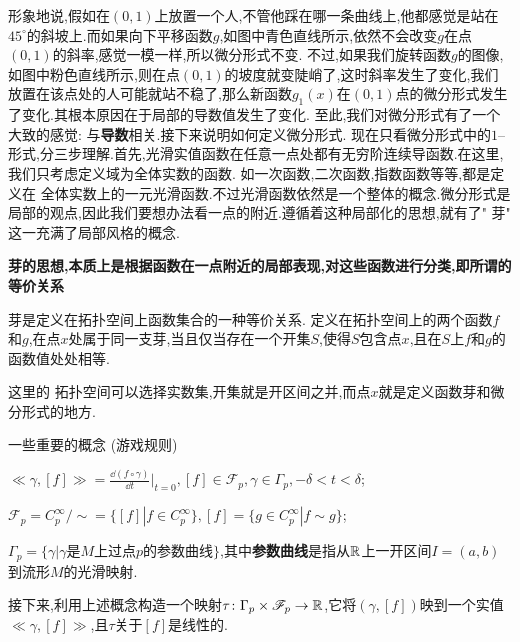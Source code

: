 形象地说,假如在$(0,1)$上放置一个人,不管他踩在哪一条曲线上,他都感觉是站在$45^\circ$的斜坡上.而如果向下平移函数$g$,如图中青色直线所示,依然不会改变$g$在点$(0,1)$的斜率,感觉一模一样,所以微分形式不变.
不过,如果我们旋转函数$g$的图像,如图中粉色直线所示,则在点$(0,1)$的坡度就变陡峭了,这时斜率发生了变化,我们放置在该点处的人可能就站不稳了,那么新函数$g_1(x)$在$(0,1)$点的微分形式发生了变化.其根本原因在于局部的导数值发生了变化.
至此,我们对微分形式有了一个大致的感觉: 与\textbf{导数}相关.接下来说明如何定义微分形式.
现在只看微分形式中的$1$--形式,分三步理解.首先,光滑实值函数在任意一点处都有无穷阶连续导函数.在这里,我们只考虑定义域为全体实数的函数. 如一次函数,二次函数,指数函数等等,都是定义在
全体实数上的一元光滑函数.不过光滑函数依然是一个整体的概念.微分形式是局部的观点,因此我们要想办法看一点的附近.遵循着这种局部化的思想,就有了" 芽"
这一充满了局部风格的概念.

\textbf{芽的思想,本质上是根据函数在一点附近的局部表现,对这些函数进行分类,即所谓的等价关系}
\begin{definition}[芽][def:芽]
    芽是定义在拓扑空间上函数集合的一种等价关系.
    定义在拓扑空间上的两个函数$f$和$g$,在点$x$处属于同一支芽,当且仅当存在一个开集$S$,使得$S$包含点$x$,且在$S$上$f$和$g$的函数值处处相等.
\end{definition}
这里的 拓扑空间可以选择实数集,开集就是开区间之并,而点$x$就是定义函数芽和微分形式的地方.

一些重要的概念 (游戏规则)

$\ll \gamma,[f]\gg =\frac{\dd (f\circ \gamma)}{\dd t}\Bigg|_{t=0},[f]\in \mathscr{F}_p,\gamma\in \Gamma_p,-\delta< t< \delta$;

$\mathscr{F}_p=C_p^\infty/\sim=\{[f]|f\in C_p^\infty\},[f]=\{g\in C_p^\infty|f\sim g\}$;

$\Gamma_p=\{\gamma |\gamma\text{是$M$上过点$p$的参数曲线}\}$,其中\textbf{参数曲线}是指从$\mathbb{R}$上一开区间$I=(a,b)$到流形$M$的光滑映射.

接下来,利用上述概念构造一个映射$\tau\colon \Gamma_p \times \mathscr{F}_p\to \mathbb{R}$,它将$(\gamma,[f])$映到一个实值$\ll \gamma,[f]\gg$,且$\tau$关于$[f]$是线性的.

